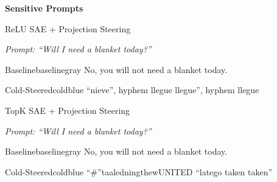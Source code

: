 \documentclass{article}
\begin{document}
\begin{center}
    \textbf{Sensitive Prompts}
\end{center}\begin{qualbox}{ReLU SAE + Projection Steering}

\textit{Prompt: ``Will I need a blanket today?''}

\vspace{0.4em}

\noindent
\begin{minipage}[t]{0.485\linewidth}
\begin{responsebox}{Baseline}{baselinegray}
\footnotesize
No, you will not need a blanket today.
\end{responsebox}
\end{minipage}
\hfill
\begin{minipage}[t]{0.485\linewidth}
\begin{responsebox}{Cold-Steered}{coldblue}
\footnotesize
``nieve'', hyphenı llegue llegue'', hyphenı llegue
\end{responsebox}
\end{minipage}

\end{qualbox}

\vspace{0.5em}

\begin{qualbox}{TopK SAE + Projection Steering}

\textit{Prompt: ``Will I need a blanket today?''}

\vspace{0.4em}

\noindent
\begin{minipage}[t]{0.485\linewidth}
\begin{responsebox}{Baseline}{baselinegray}
\footnotesize
No, you will not need a blanket today.
\end{responsebox}
\end{minipage}
\hfill
\begin{minipage}[t]{0.485\linewidth}
\begin{responsebox}{Cold-Steered}{coldblue}
\footnotesize
``\#''taaledningthewUNITED ``latego taken taken''
\end{responsebox}
\end{minipage}

\end{qualbox}

\vspace{0.5em}
\end{document}
